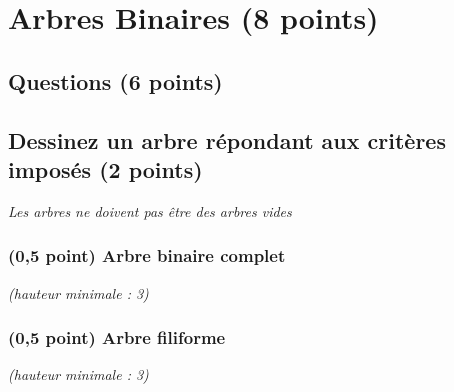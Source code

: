 \documentclass[11pt,a4paper]{article}
\begin{document}


\vspace*{-0.75cm}


\section{Arbres Binaires (8 points)}

\subsection*{Questions (6 points) }

\subsection{Dessinez un arbre répondant aux critères imposés (2 points) }

\begin{center}
\textit{Les arbres ne doivent pas être des arbres vides}
\end{center}

\vspace{-0.5cm}

\begin{table}[ht!]
  \centering
  \begin{minipage}{0.50\textwidth}
    \centering

\subsubsection{(0,5 point) Arbre binaire complet}

\textit{(hauteur minimale : 3)}

\vspace*{6.5cm}

  \end{minipage}
  \hfillx
  \begin{minipage}{0.50\textwidth}
    \centering

\subsubsection{(0,5 point) Arbre filiforme}

\textit{(hauteur minimale : 3)}

\vspace*{6.5cm}

  \end{minipage}
\end{table}
\end{document}

